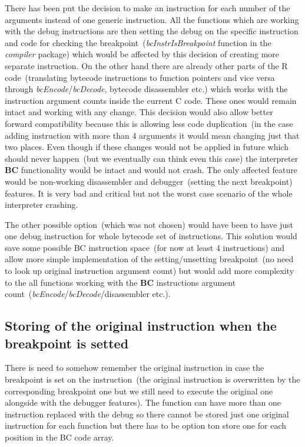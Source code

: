 \documentclass[thesis=M,english]{FITthesis}[2018/10/20]
\begin{document}
There has been put the decision to make an instruction for each number of the arguments instead of one generic instruction. All the functions which are working with the debug instructions are then setting the debug on the specific instruction and code for checking the breakpoint~(\textit{bcInstrIsBreakpoint} function in the \textit{compiler} package) which would be affected by this decision of creating more separate instruction. On the other hand there are already other parts of the R code~(translating bytecode instructions to function pointers and vice versa through \textit{bcEncode}/\textit{bcDecode}, bytecode disassembler etc.) which works with the instruction argument counts inside the current C code. These ones would remain intact and working with any change. This decision would also allow better forward compatibility because this is allowing less code duplication~(in the case adding instruction with more than 4 arguments it would mean changing just that two places. Even though if these changes would not be applied in future which should never happen~(but we eventually can think even this case) the interpreter \textbf{BC} functionality would be intact and would not crash. The only affected feature would be non-working disassembler and debugger~(setting the next breakpoint) features. It is very bad and critical but not the worst case scenario of the whole interpreter crashing.

The other possible option~(which was not chosen) would have been to have just one debug instruction for whole bytecode set of instructions. This solution would save some possible BC instruction space~(for now at least 4 instructions) and allow more simple implementation of the setting/unsetting breakpoint~(no need to look up original instruction argument count) but would add more complexity to the all functions working with the \textbf{BC} instructions argument count~(\textit{bcEncode}/\textit{bcDecode}/disassembler etc.).

\subsection{Storing of the original instruction when the breakpoint is setted}\label{storing-original-instructions}

There is need to somehow remember the original instruction in case the breakpoint is set on the instruction~(the original instruction is overwritten by the corresponding breakpoint one but we still need to execute the original one alongside with the debugger features). The function can have more than one instruction replaced with the debug so there cannot be stored just one original instruction for each function but there has to be option ton store one for each position in the BC code array.
\end{document}
